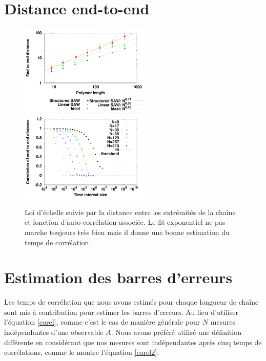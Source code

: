 \documentclass[a4paper,11pt]{article}
\begin{document}
\section*{Distance end-to-end}

\begin{figure}[H]
\begin{center}
\includegraphics[width=0.55\textwidth]{endtoenddistance.pdf}
\includegraphics[width=0.55\textwidth]{correlendtoend.pdf}

\caption{Loi d'échelle suivie par la distance entre les extrémités de la chaîne et fonction d’auto-corrélation associée. Le fit exponentiel ne pas marche toujours très bien mais il donne une bonne estimation du temps de corrélation.}
\label{endtoend1}
\end{center}
\end{figure}

\section*{Estimation des barres d'erreurs}

Les temps de corrélation que nous avons estimés pour chaque longueur de chaîne sont mis à contribution pour estimer les barres d'erreurs. Au lieu d'utiliser l'équation \ref{corel},
 comme c'est le cas de manière générale pour $N$ mesures indépendantes d'une observable $A$. Nous avons préféré utilisé une définition différente en considérant que nos mesures sont indépendantes après cinq temps de corrélations, comme le montre l'équation \ref{corel2}.
\end{document}
